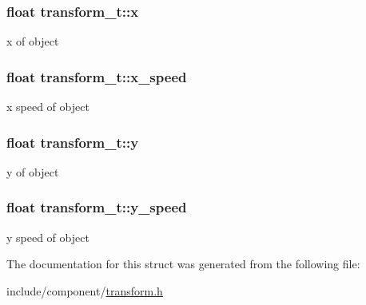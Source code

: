 \subsubsection[{\texorpdfstring{x}{x}}]{\setlength{\rightskip}{0pt plus 5cm}float transform\+\_\+t\+::x}\hypertarget{structtransform__t_ae80f93e0a38c783dbaf2273c04d75aa9}{}\label{structtransform__t_ae80f93e0a38c783dbaf2273c04d75aa9}
x of object 
\subsubsection[{\texorpdfstring{x\+\_\+speed}{x\_speed}}]{\setlength{\rightskip}{0pt plus 5cm}float transform\+\_\+t\+::x\+\_\+speed}\hypertarget{structtransform__t_a3dfafe13ab0fcbf01ad5535f30c13bde}{}\label{structtransform__t_a3dfafe13ab0fcbf01ad5535f30c13bde}
x speed of object 
\subsubsection[{\texorpdfstring{y}{y}}]{\setlength{\rightskip}{0pt plus 5cm}float transform\+\_\+t\+::y}\hypertarget{structtransform__t_ab5c2c657ca08da07220eda12f4a3fa26}{}\label{structtransform__t_ab5c2c657ca08da07220eda12f4a3fa26}
y of object 
\subsubsection[{\texorpdfstring{y\+\_\+speed}{y\_speed}}]{\setlength{\rightskip}{0pt plus 5cm}float transform\+\_\+t\+::y\+\_\+speed}\hypertarget{structtransform__t_a749cd7bbef5ec055a35fb3d0e4dcda0c}{}\label{structtransform__t_a749cd7bbef5ec055a35fb3d0e4dcda0c}
y speed of object 

The documentation for this struct was generated from the following file\+:\begin{DoxyCompactItemize}
\item 
include/component/\hyperlink{transform_8h}{transform.\+h}\end{DoxyCompactItemize}
